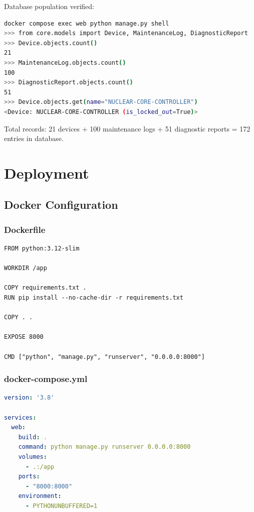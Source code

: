 \documentclass[12pt,a4paper]{article}
\begin{document}
Database population verified:
\begin{lstlisting}[language=bash]
docker compose exec web python manage.py shell
>>> from core.models import Device, MaintenanceLog, DiagnosticReport
>>> Device.objects.count()
21
>>> MaintenanceLog.objects.count()
100
>>> DiagnosticReport.objects.count()
51
>>> Device.objects.get(name="NUCLEAR-CORE-CONTROLLER")
<Device: NUCLEAR-CORE-CONTROLLER (is_locked_out=True)>
\end{lstlisting}

Total records: 21 devices + 100 maintenance logs + 51 diagnostic reports = 172 entries in database.

\newpage

\section{Deployment}

\subsection{Docker Configuration}

\subsubsection{Dockerfile}

\begin{lstlisting}[language=Docker]
FROM python:3.12-slim

WORKDIR /app

COPY requirements.txt .
RUN pip install --no-cache-dir -r requirements.txt

COPY . .

EXPOSE 8000

CMD ["python", "manage.py", "runserver", "0.0.0.0:8000"]
\end{lstlisting}

\subsubsection{docker-compose.yml}

\begin{lstlisting}[language=YAML]
version: '3.8'

services:
  web:
    build: .
    command: python manage.py runserver 0.0.0.0:8000
    volumes:
      - .:/app
    ports:
      - "8000:8000"
    environment:
      - PYTHONUNBUFFERED=1
\end{lstlisting}
\end{document}
